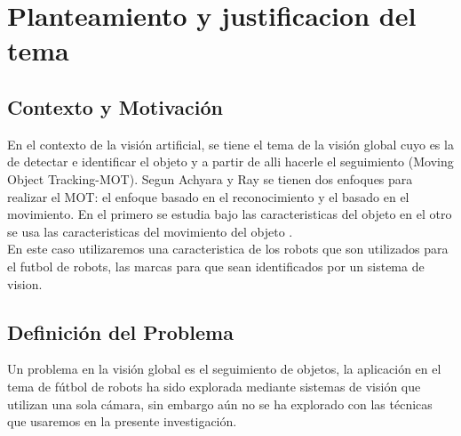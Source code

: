 \documentclass[conference]{IEEEtran}
\begin{document}

 
\section{Planteamiento y justificacion del tema}
\subsection{Contexto y Motivaci\'on}
En el contexto de la visi\'on artificial, se tiene el tema de la visi\'on global cuyo  es la de detectar e identificar el objeto y  a partir de alli hacerle el seguimiento (Moving Object Tracking-MOT). Segun Achyara y Ray  se tienen dos enfoques para realizar el MOT: el enfoque basado en el reconocimiento y el basado en el movimiento. En el primero se estudia bajo las caracteristicas del objeto en el otro se usa las caracteristicas del movimiento del objeto \cite{acharya_g}.\\
En este caso utilizaremos una caracteristica de los robots que son utilizados para el futbol de robots, las marcas para que sean identificados por un sistema de vision.

\subsection{Definici\'on del Problema}
Un problema en la visi\'on global es el seguimiento de objetos, la aplicaci\'on en el tema de f\'utbol de robots ha sido explorada mediante sistemas de visi\'on que utilizan una sola c\'amara, sin embargo a\'un no se ha explorado con las t\'ecnicas que usaremos en la presente investigaci\'on.
\end{document}
